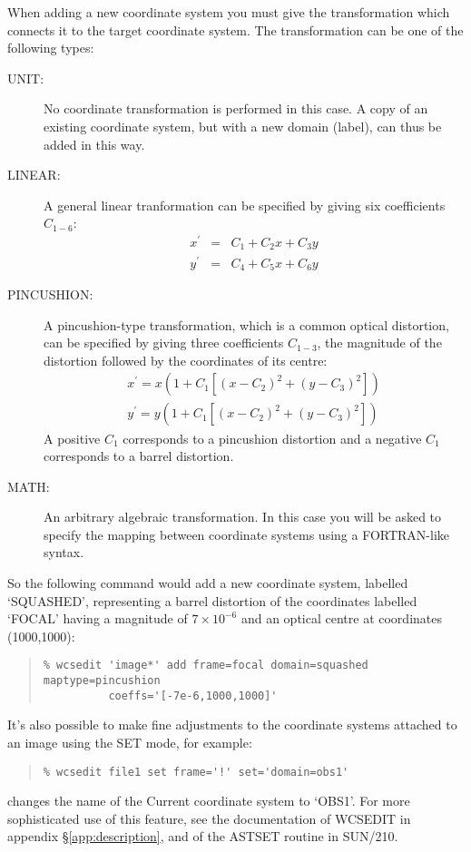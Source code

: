 \documentclass[twoside,11pt]{article}
\newcommand{\htmlref}[2]{#1}
\newcommand{\latexhtml}[2]{#1}
\newcommand{\xref}[3]{#1}
\renewcommand{\_}{\texttt{\symbol{95}}}
\newcommand{\ttsize}{\latexhtml{\small}{}}
\newenvironment{myquote}{\begin{quote}\ttsize}{\end{quote}}
\newcommand{\xroutine}[1]{\htmlref{{\sc #1}}{#1}}
\begin{document}
When adding a new 
coordinate system you must give the transformation which connects it 
to the target coordinate system.
The transformation can be one of the following types:
\begin{description}
\item[UNIT:]
No coordinate transformation is performed in this case.
A copy of an existing coordinate system, but with a new domain (label),
can thus be added in this way.
\item[LINEAR:]
A general linear tranformation can be specified by giving six
coefficients $C_{1-6}$:
\begin{eqnarray*}
   x^\prime & = & C_1 + C_2 x + C_3 y \\
   y^\prime & = & C_4 + C_5 x + C_6 y
\end{eqnarray*}
\item[PINCUSHION:]
A pincushion-type transformation,
which is a common optical distortion,
can be specified by giving three coefficients $C_{1-3}$, 
the magnitude of the distortion followed by the coordinates of its centre:
\begin{eqnarray*}
   x^\prime = x \left( 1 + C_1  \left[ \left( x - C_2 \right)^2 
                                     + \left( y - C_3 \right)^2 \right] \right)
   \\
   y^\prime = y \left( 1 + C_1  \left[ \left( x - C_2 \right)^2 
                                     + \left( y - C_3 \right)^2 \right] \right)
\end{eqnarray*}
A positive $C_1$ corresponds to a pincushion distortion and 
a negative $C_1$ corresponds to a barrel distortion.
\item[MATH:]
An arbitrary algebraic transformation.
In this case you will be asked to specify the mapping between coordinate
systems using a FORTRAN-like syntax.
\end{description}
So the following command would 
add a new coordinate system, labelled `SQUASHED', 
representing a barrel distortion of the coordinates labelled `FOCAL' 
having a magnitude of $7\times 10^{-6}$ 
and an optical centre at coordinates (1000,1000):
\begin{myquote}
\begin{verbatim}
% wcsedit 'image*' add frame=focal domain=squashed maptype=pincushion 
          coeffs='[-7e-6,1000,1000]'
\end{verbatim}
\end{myquote}

It's also possible to make fine adjustments to the coordinate
systems attached to an image using the SET mode, for example:
\begin{myquote}
\begin{verbatim}
% wcsedit file1 set frame='!' set='domain=obs1'
\end{verbatim}
\end{myquote}
changes the name of the Current coordinate system to `OBS1'.
For more sophisticated use of this feature, see the documentation
of \xroutine{WCSEDIT} in appendix \S\ref{app:description}, and of
the \xref{AST\_SET}{sun210}{AST\_SET} routine in \xref{SUN/210}{sun210}{}.
\end{document}
